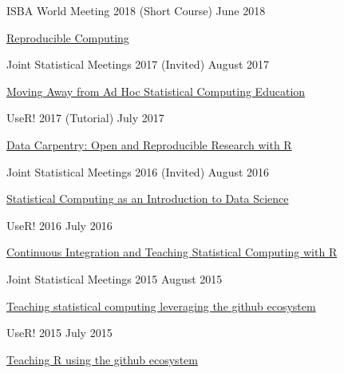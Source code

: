 \documentclass[margin,line]{res}
\begin{document}
\begin{resume}
ISBA World Meeting 2018 (Short Course) \hfill June 2018
\begin{list1}
\item[] \href{https://mine-cetinkaya-rundel.github.io/repro-compute-isba18/}{Reproducible Computing}
\end{list1}
\vspace{-3mm}

Joint Statistical Meetings 2017 (Invited) \hfill August 2017
\begin{list1}
\item[] \href{https://github.com/rundel/Presentations/tree/master/JSM%202017}{Moving Away from Ad Hoc Statistical Computing Education}
\end{list1}
\vspace{-3mm}

UseR! 2017 (Tutorial) \hfill July 2017
\begin{list1}
\item[] \href{https://github.com/fmichonneau/2017-useR-reproducibility/}{Data Carpentry: Open and Reproducible Research with R}
\end{list1}
\vspace{-3mm}

Joint Statistical Meetings 2016 (Invited) \hfill August 2016
\begin{list1}
\item[] \href{https://github.com/rundel/Presentations/tree/master/JSM%202016}{Statistical Computing as an Introduction to Data Science}
\end{list1}
\vspace{-3mm}

UseR! 2016 \hfill July 2016
\begin{list1}
\item[] \href{https://github.com/rundel/Presentations/tree/master/UseR2016}{Continuous Integration and Teaching Statistical Computing with R}
\end{list1}
\vspace{-3mm}


Joint Statistical Meetings 2015 \hfill August 2015
\begin{list1}
\item[] \href{https://github.com/rundel/Presentations/tree/master/JSM%202015}{Teaching statistical computing leveraging the github ecosystem}
\end{list1}
\vspace{-3mm}

UseR! 2015 \hfill July 2015
\begin{list1}
\item[] \href{https://github.com/rundel/Presentations/tree/master/UseR2015}{Teaching R using the github ecosystem}
\end{list1}
\vspace{-3mm}



\end{resume}
\end{document}
